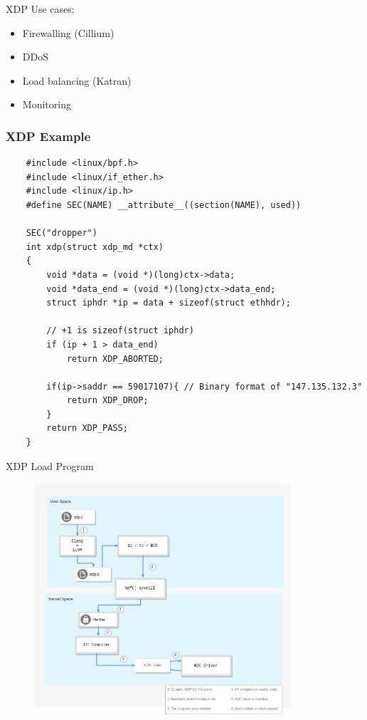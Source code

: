 \documentclass{beamer}
\begin{document}
\begin{frame}{XDP}
  Use cases:
  \begin{itemize}
    \item Firewalling (Cillium\footnotemark[1])
    \item DDoS
    \item Load balancing (Katran\footnotemark[2])
    \item Monitoring
  \end{itemize}
\end{frame}

\begin{frame}[fragile]
  \frametitle{XDP Example}
  \begin{verbatim}
    #include <linux/bpf.h>
    #include <linux/if_ether.h>
    #include <linux/ip.h>
    #define SEC(NAME) __attribute__((section(NAME), used))

    SEC("dropper")
    int xdp(struct xdp_md *ctx)
    {
        void *data = (void *)(long)ctx->data;
        void *data_end = (void *)(long)ctx->data_end;
        struct iphdr *ip = data + sizeof(struct ethhdr);

        // +1 is sizeof(struct iphdr)
        if (ip + 1 > data_end)
            return XDP_ABORTED;

        if(ip->saddr == 59017107){ // Binary format of "147.135.132.3"
            return XDP_DROP;
        }
        return XDP_PASS;
    }
  \end{verbatim}
\end{frame}

\begin{frame}{XDP Load Program}
  \begin{figure}
    \includegraphics[width=0.85\textwidth]{./xdp_workflow.png}

  \end{figure}
\end{frame}
\end{document}
